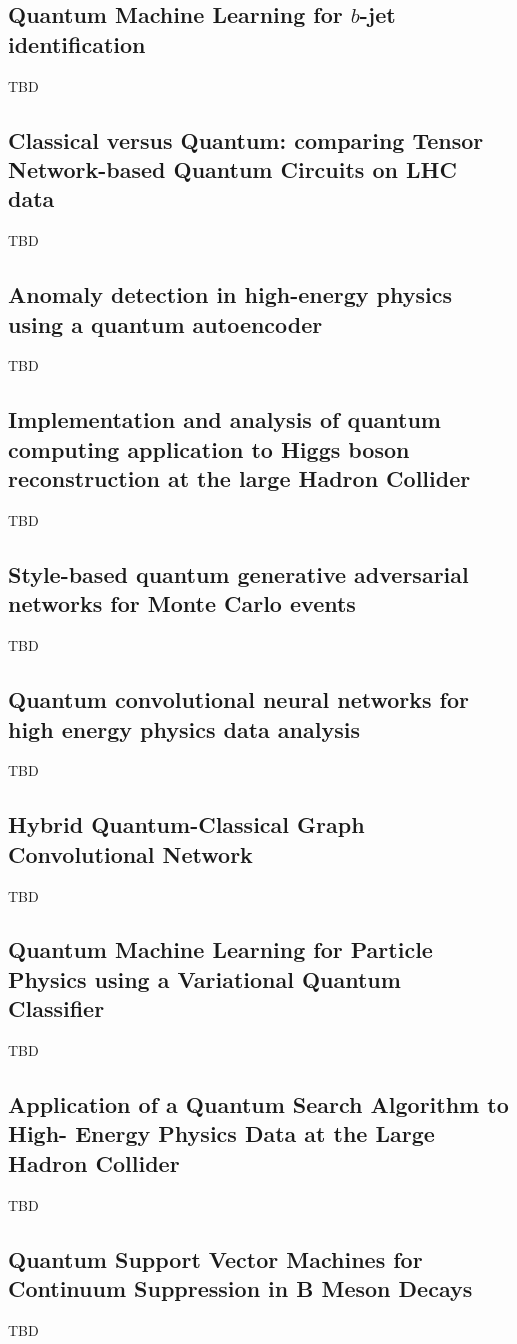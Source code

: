 \subsection{Quantum Machine Learning for $b$-jet identification~\cite{Gianelle:2022unu}}
TBD
\subsection{Classical versus Quantum: comparing Tensor Network-based Quantum Circuits on LHC data~\cite{Araz:2022haf}}
TBD
\subsection{Anomaly detection in high-energy physics using a quantum autoencoder~\cite{Ngairangbam:2021yma}}
TBD
\subsection{Implementation and analysis of quantum computing application to Higgs boson reconstruction at the large Hadron Collider~\cite{AlexiadesArmenakas:2021lrs}}
TBD
\subsection{Style-based quantum generative adversarial networks for Monte Carlo events~\cite{Bravo-Prieto:2021ehz}}
TBD
\subsection{Quantum convolutional neural networks for high energy physics data analysis~\cite{Chen:2020zkj}}
TBD
\subsection{Hybrid Quantum-Classical Graph Convolutional Network~\cite{Chen:2021ouz}}
TBD
\subsection{Quantum Machine Learning for Particle Physics using a Variational Quantum Classifier~\cite{Blance:2020nhl}}
TBD
\subsection{Application of a Quantum Search Algorithm to High- Energy Physics Data at the Large Hadron Collider~\cite{Armenakas:2020ymp}}
TBD
\subsection{Quantum Support Vector Machines for Continuum Suppression in B Meson Decays~\cite{Heredge:2021vww}}
TBD
